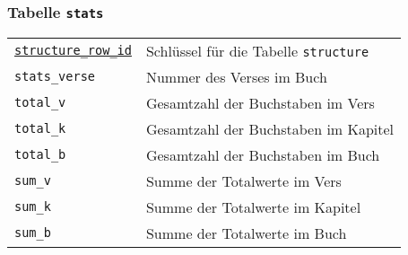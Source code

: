 \documentclass[a4paper]{scrartcl}
\begin{document}
\subsubsection{Tabelle \texttt{stats}}

\begin{tabular}{l|l}
\texttt{\underline{structure\_row\_id}}	& Schlüssel für die Tabelle \texttt{structure}	\\
\texttt{stats\_verse}		& Nummer des Verses im Buch	\\
\texttt{total\_v}			& Gesamtzahl der Buchstaben im Vers	\\
\texttt{total\_k}			& Gesamtzahl der Buchstaben im Kapitel	\\
\texttt{total\_b}			& Gesamtzahl der Buchstaben im Buch	\\
\texttt{sum\_v}				& Summe der Totalwerte im Vers	\\
\texttt{sum\_k}				& Summe der Totalwerte im Kapitel	\\
\texttt{sum\_b}				& Summe der Totalwerte im Buch	\\
\end{tabular}


\end{document}
